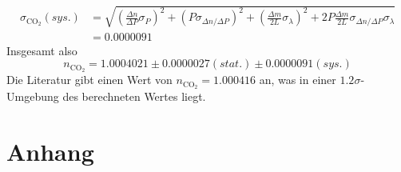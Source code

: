 \documentclass[12pt,a4paper]{article}
\begin{document}
\begin{align}
\sigma_{\text{CO}_2}(sys.)&=\sqrt{\left(\frac{\Delta n}{\Delta P}\sigma_P\right)^2+(P\sigma_{\Delta n/\Delta P})^2+\left(\frac{\Delta m}{2L}\sigma_{\lambda}\right)^2+2P\frac{\Delta m}{2L}\sigma_{\Delta n/\Delta P}\sigma_{\lambda}}\nonumber\\
&=0.0000091
\end{align}
Insgesamt also
\begin{equation}
n_{\text{CO}_2}=1.0004021\pm 0.0000027(stat.)\pm 0.0000091(sys.)
\end{equation}
Die Literatur gibt einen Wert von $n_{\text{CO}_2}=1.000416$ an, was in einer $1.2\sigma$-Umgebung des berechneten Wertes liegt.

\newpage
\section{Anhang}
\end{document}
